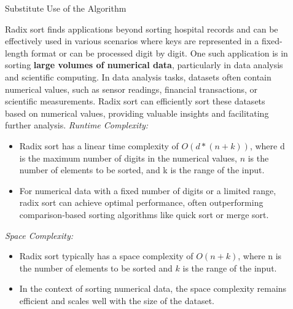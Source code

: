 \documentclass[final]{beamer}
\newlength{\sepwidth}
\newlength{\colwidth}
\newcommand{\separatorcolumn}{\begin{column}{\sepwidth}\end{column}}
\begin{document}
\begin{frame}[t]
\begin{columns}[t]
\begin{column}{\colwidth}
			
		\end{column}
	
		\separatorcolumn
		
		\begin{column}{\colwidth}
			
			\begin{alertblock}{Substitute Use of the Algorithm}{}
            
           Radix sort finds applications beyond sorting hospital records and can be effectively used in various scenarios where keys are represented in a fixed-length format or can be processed digit by digit. One such application is in sorting \textbf{large volumes of numerical data}, particularly in data analysis and scientific computing.
            \addlinespace
            In data analysis tasks, datasets often contain numerical values, such as sensor readings, financial transactions, or scientific measurements. Radix sort can efficiently sort these datasets based on numerical values, providing valuable insights and facilitating further analysis.
            \addlinespace
            \textit{Runtime Complexity:}
            
            \begin{itemize}
                \item Radix sort has a linear time complexity of $O(d*(n+k))$, where d is the maximum number of digits in the numerical values, $n$ is the number of elements to be sorted, and k is the range of the input.
            \end{itemize}
            
            \begin{itemize}
                \item For numerical data with a fixed number of digits or a limited range, radix sort can achieve optimal performance, often outperforming comparison-based sorting algorithms like quick sort or merge sort.
            \end{itemize}


            \textit{Space Complexity:}
            
            \begin{itemize}
                \item Radix sort typically has a space complexity of $O(n+k)$, where n is the number of elements to be sorted and $k$ is the range of the input.
            \end{itemize}
            
            \begin{itemize}
                \item In the context of sorting numerical data, the space complexity remains efficient and scales well with the size of the dataset.
            \end{itemize}
            

\end{alertblock}
\end{column}
\end{columns}
\end{frame}
\end{document}
